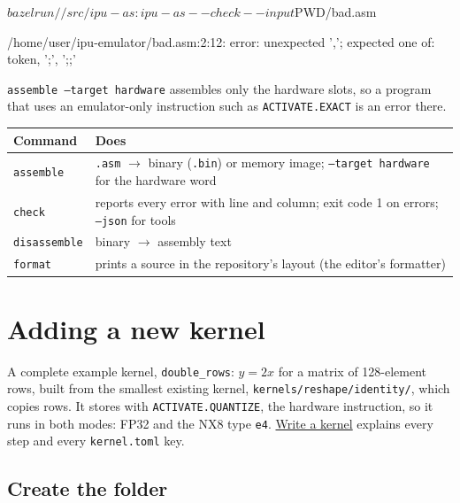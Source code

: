 \documentclass[11pt,a4paper]{article}
\newcommand{\doc}[2]{\href{https://rechefe.github.io/ipu-emulator/dev/#1/}{\textcolor{accent}{#2}}}
\begin{document}
\begin{termcmdtop}
$ bazel run //src/ipu-as:ipu-as -- check --input $PWD/bad.asm
\end{termcmdtop}
\begin{termout}
/home/user/ipu-emulator/bad.asm:2:12: error: unexpected ','; expected one of: token, ';', ';;'
\end{termout}

\texttt{assemble --target hardware} assembles only the hardware slots, so a
program that uses an emulator-only instruction such as
\texttt{ACTIVATE.EXACT} is an error there.

\begin{center}
\begin{tabularx}{\linewidth}{lX}
\toprule
Command & Does \\
\midrule
\texttt{assemble} & \texttt{.asm} $\rightarrow$ binary (\texttt{.bin}) or memory image; \texttt{--target hardware} for the hardware word \\
\texttt{check} & reports every error with line and column; exit code 1 on errors; \texttt{--json} for tools \\
\texttt{disassemble} & binary $\rightarrow$ assembly text \\
\texttt{format} & prints a source in the repository's layout (the editor's formatter) \\
\bottomrule
\end{tabularx}
\end{center}

\section{Adding a new kernel}\label{sec:newkernel}

A complete example kernel, \texttt{double\_rows}: $y = 2x$ for a matrix of
128-element rows, built from the smallest existing kernel,
\texttt{kernels/reshape/identity/}, which copies rows. It stores with
\texttt{ACTIVATE.QUANTIZE}, the hardware instruction, so it runs in both
modes: FP32 and the NX8 type \texttt{e4}.
\doc{how-to/write-a-kernel}{Write a kernel} explains every step and every
\texttt{kernel.toml} key.

\subsection{Create the folder}

\end{document}
